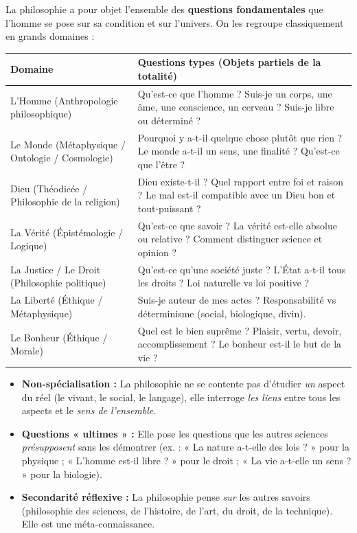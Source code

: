\documentclass[11pt]{article}
\newcommand{\cle}[1]{{\popxbold\color{popdark}#1}}
\begin{document}
\begin{propriete}
La philosophie a pour objet l'ensemble des \textbf{questions fondamentales} que l'homme se pose sur sa condition et sur l'univers. On les regroupe classiquement en grands domaines :
\begin{center}
\begin{tabularx}{\linewidth}{|l|X|}\hline
\rowcolor{poppurpleL} \textbf{Domaine} & \textbf{Questions types (Objets partiels de la totalité)} \\ \hline
\cle{L'Homme (Anthropologie philosophique)} & Qu'est-ce que l'homme ? Suis-je un corps, une âme, une conscience, un cerveau ? Suis-je libre ou déterminé ? \\ \hline
\cle{Le Monde (Métaphysique / Ontologie / Cosmologie)} & Pourquoi y a-t-il quelque chose plutôt que rien ? Le monde a-t-il un sens, une finalité ? Qu'est-ce que l'être ? \\ \hline
\cle{Dieu (Théodicée / Philosophie de la religion)} & Dieu existe-t-il ? Quel rapport entre foi et raison ? Le mal est-il compatible avec un Dieu bon et tout-puissant ? \\ \hline
\cle{La Vérité (Épistémologie / Logique)} & Qu'est-ce que savoir ? La vérité est-elle absolue ou relative ? Comment distinguer science et opinion ? \\ \hline
\cle{La Justice / Le Droit (Philosophie politique)} & Qu'est-ce qu'une société juste ? L'État a-t-il tous les droits ? Loi naturelle vs loi positive ? \\ \hline
\cle{La Liberté (Éthique / Métaphysique)} & Suis-je auteur de mes actes ? Responsabilité vs déterminisme (social, biologique, divin). \\ \hline
\cle{Le Bonheur (Éthique / Morale)} & Quel est le bien suprême ? Plaisir, vertu, devoir, accomplissement ? Le bonheur est-il le but de la vie ? \\ \hline
\end{tabularx}
\end{center}
\end{propriete}

\begin{aretenir}
\begin{itemize}
    \item \textbf{Non-spécialisation :} La philosophie ne se contente pas d'étudier \emph{un} aspect du réel (le vivant, le social, le langage), elle interroge \emph{les liens} entre tous les aspects et le \emph{sens de l'ensemble}.
    \item \textbf{Questions « ultimes » :} Elle pose les questions que les autres sciences \emph{présupposent} sans les démontrer (ex. : « La nature a-t-elle des lois ? » pour la physique ; « L'homme est-il libre ? » pour le droit ; « La vie a-t-elle un sens ? » pour la biologie).
    \item \textbf{Secondarité réflexive :} La philosophie pense \emph{sur} les autres savoirs (philosophie des sciences, de l'histoire, de l'art, du droit, de la technique). Elle est une \cle{méta-connaissance}.
\end{itemize}
\end{aretenir}
\end{document}
